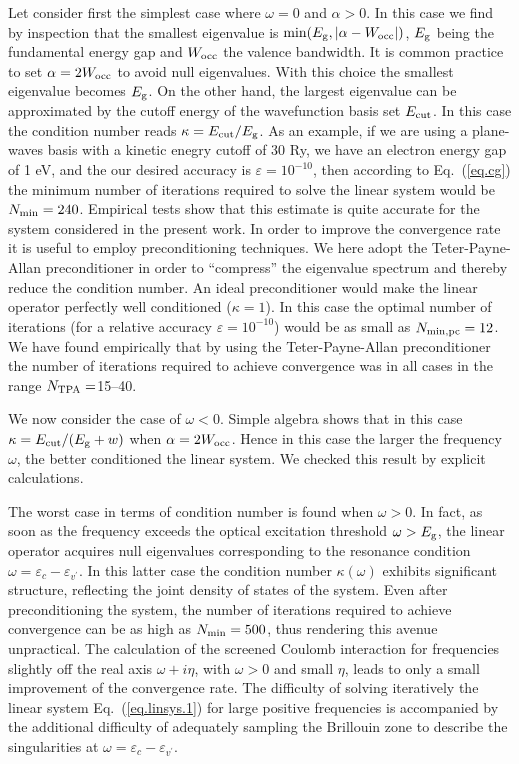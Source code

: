 \documentclass[twocolumn,prb,showpacs,superscriptaddress]{revtex4}
\def\w{\omega}
\def\E{\varepsilon}
\def\vp{{v^\prime}}
\begin{document}
Let consider first the simplest case where $\w=0$ and $\alpha>0$. In this case 
we find by inspection that the smallest eigenvalue is $\min(E_{\rm g}, |\alpha-W_{\rm occ}|)$, 
$E_{\rm g}$ being the fundamental energy gap and $W_{\rm occ}$ the valence bandwidth.
It is common practice to set $\alpha=2W_{\rm occ}$ to avoid null eigenvalues.
\cite{baroni.rmp} With this choice the smallest eigenvalue becomes $E_{\rm g}$.
On the other hand, the largest eigenvalue can be approximated by the
cutoff energy of the wavefunction basis set $E_{\rm cut}$.
In this case the condition number reads $\kappa = E_{\rm cut}/E_{\rm g}$.
As an example, if we are using a plane-waves basis with a kinetic enegry
cutoff of 30 Ry, we have an electron energy gap of 1 eV, 
and the our desired accuracy is $\varepsilon=10^{-10}$, then according to
Eq.\ (\ref{eq.cg}) the minimum number of iterations required to solve 
the linear system would be $N_{\rm min} = 240$. Empirical tests show that 
this estimate is quite accurate for the system considered in the present work.
In order to improve the convergence rate it is useful to employ preconditioning
techniques. We here adopt the Teter-Payne-Allan preconditioner\cite{tpa}
in order to ``compress'' the eigenvalue spectrum and thereby reduce the
condition number. An ideal preconditioner would make the linear operator
perfectly well conditioned ($\kappa=1$). In this case
the optimal  number of iterations (for a relative accuracy $\varepsilon=10^{-10}$) 
would be as small as $N_{\rm min,pc} = 12$. We have found empirically
that by using the Teter-Payne-Allan 
preconditioner the number of iterations
required to achieve convergence was in all cases in the range $N_{\rm TPA}=$15--40. 

We now consider the case of $\w<0$. Simple algebra shows that in this case
$\kappa = E_{\rm cut}/(E_{\rm g} + w)$
when $\alpha = 2W_{\rm occ}$. Hence in this case the larger the frequency $\w$,
the better conditioned the linear system. We checked this result
by explicit calculations.

The worst case in terms of condition number is found when $\w>0$. 
In fact, as soon as the frequency exceeds the optical excitation
threshold $\w>E_{\rm g}$, the linear operator acquires null eigenvalues 
corresponding to the resonance condition $\w = \E_c - \E_\vp$. 
In this latter case the condition
number $\kappa(\w)$ exhibits significant structure, reflecting
the joint density of states of the system. Even after preconditioning the system, 
the number of iterations required to achieve convergence can be as high as 
$N_{\rm min} = 500$, thus rendering this avenue unpractical.
The calculation of the screened Coulomb interaction for frequencies slightly
off the real axis $\w+i\eta$, with $\w>0$ and small $\eta$, leads to only a small
improvement of the convergence rate.
The difficulty of solving iteratively the linear system Eq.\ (\ref{eq.linsys.1})
for large positive frequencies is accompanied by the additional difficulty 
of adequately sampling the Brillouin zone to describe the singularities at $\w = \E_c - \E_\vp$.
\end{document}

